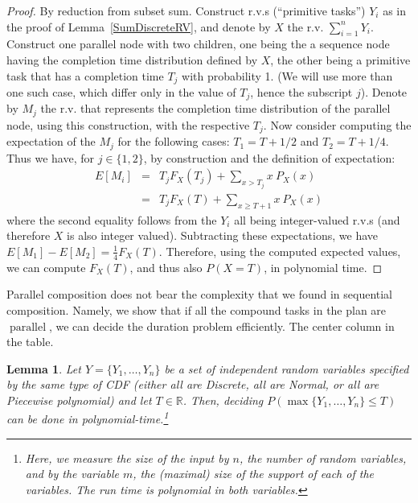 \documentclass{article}
\newtheorem{lemma}{Lemma}
\DeclareMathOperator{\parl}{parallel}
\begin{document}
\begin{proof}
By reduction from subset sum. Construct r.v.s (``primitive tasks'') $Y_i$ as in the proof of Lemma~\ref{SumDiscreteRV}, and denote
by $X$ the r.v. $\sum_{i=1}^{n} Y_{i}$. Construct one parallel node
with two children, one being the a sequence node having the
completion time distribution
defined by $X$, the other being a primitive task that has a completion time
$T_j$ with probability 1. (We will use more than one such case,
which differ only in the value of $T_j$, hence the subscript $j$).
Denote by $M_j$ the r.v. that represents the completion time
distribution of the parallel node, using this
construction, with the respective $T_j$. Now consider computing the
expectation of the $M_j$ for the following cases: $T_1 = T+{1}/{2}$
and $T_2 = T+{1}/{4}$.
Thus we have, for $j\in\{ 1, 2\}$, by construction and the definition of
expectation:
{\small
\begin{eqnarray*}
E[M_i] &=& T_j F_{X}( T_j) + \sum_{x > T_j} x~P_{X}(x)  \\
          &=& T_j F_{X}( T)+ \sum_{x \geq T+1} x~P_{X}(x)
\end{eqnarray*}}
where the second equality follows from the $Y_i$ all being
integer-valued r.v.s (and therefore $X$ is also integer valued).
Subtracting these expectations, we have $E[M_1]-E[M_2]=\frac{1}{4}F_{X}( T)$.
Therefore, using the computed expected values, we can compute
$F_{X}( T)$, and thus also $P(X=T)$, in polynomial time.
\end{proof}

Parallel composition does not bear the complexity that we found in sequential composition. Namely, we show that if all the compound tasks in the plan are $\parl$, we can decide the duration problem efficiently. The center column in the table.

\begin{lemma} \label{TPar}
	Let $Y=\{Y_1,\dots,Y_n\}$ be a set of independent random variables specified by the same type of %
	CDF (either all are Discrete, all are Normal, or all are Piecewise polynomial) and let $T \in \mathbb{R}$. Then, deciding $P(\max\{Y_1,\dots,Y_n\} \leq T) $ 
	can be done in polynomial-time.\footnote{Here, we measure the size of the input by $n$, the number of random variables, and by the variable $m$, the (maximal) size of the support of each of the variables. The run time is polynomial in both variables.}
\end{lemma}
\end{document}
